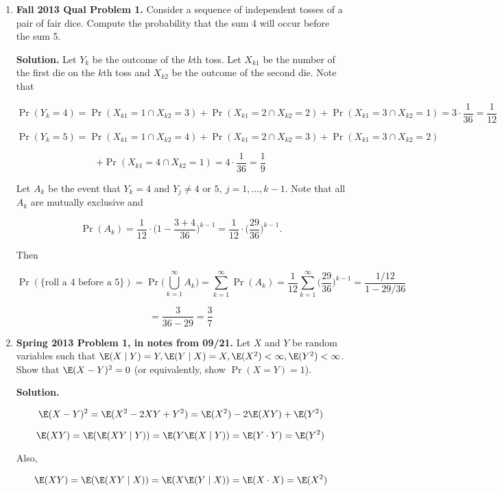 \begin{enumerate}[(1)]
\item \textbf{Fall 2013 Qual Problem 1.} Consider a sequence of independent tosses of a pair of fair dice. Compute the probability that the sum 4 will occur before the sum 5.

\textbf{Solution.} Let \(Y_k\) be the outcome of the \(k\)th toss. Let \(X_{k1}\) be the number of the first die on the \(k\)th toss and \(X_{k2}\) be the outcome of the second die. Note that

\[
\Pr(Y_k = 4) = \Pr(X_{k1} = 1 \cap X_{k2} = 3) + \Pr(X_{k1} = 2 \cap X_{k2} = 2) + \Pr(X_{k1} = 3 \cap X_{k2} = 1) = 3 \cdot \frac{1}{36} = \frac{1}{12} 
\]

\[
\Pr(Y_k = 5) = \Pr(X_{k1} = 1 \cap X_{k2} = 4) + \Pr(X_{k1} = 2 \cap X_{k2} = 3) + \Pr(X_{k1} = 3 \cap X_{k2} = 2) 
\]

\[
+ \Pr(X_{k1} = 4 \cap X_{k2} = 1) = 4 \cdot \frac{1}{36} = \frac{1}{9} 
\]

Let \(A_k\) be the event that \(Y_k = 4\) and \(Y_j \neq 4 \text{ or }5 , \  j = 1, \ldots, k-1\). Note that all \(A_k\) are mutually exclusive and 

\[
\Pr(A_k) = \frac{1}{12}\cdot \bigg(1 - \frac{3 + 4}{36} \bigg)^{k-1} = \frac{1}{12} \cdot \bigg( \frac{29}{36} \bigg)^{k-1}.
\]

Then

\[
\Pr(\{\text{roll a 4 before a 5}\}) = \Pr\bigg( \bigcup_{k=1}^\infty A_k \bigg) = \sum_{k=1}^\infty \Pr(A_k) = \frac{1}{12}  \sum_{k=1}^\infty \bigg( \frac{29}{36} \bigg)^{k-1} = \frac{1/12}{1 - 29/36}
\]

\[
= \frac{3}{36 -29} = \boxed{ \frac{3}{7}}
\]


\item \textbf{Spring 2013 Problem 1, in notes from 09/21.} Let \(X\) and \(Y\) be random variables such that  \(\E(X \mid Y) = Y, \E(Y \mid X) = X, \E(X^2) < \infty, \E(Y^2) < \infty\). Show that \(\E(X-Y)^2 = 0 \) (or equivalently, show \(\Pr(X = Y) = 1\)).

\textbf{Solution.} 

\[
\E(X-Y)^2 = \E(X^2 - 2XY + Y^2) = \E(X^2) - 2 \E(XY) + \E(Y^2)
\]

\[
\E(XY) = \E( \E(XY\mid Y)) = \E(Y\E(X\mid Y)) = \E(Y \cdot Y) = \E(Y^2)
\]

Also,

\[
\E(XY) = \E(\E(XY \mid X)) = \E(X \E(Y \mid X)) = \E( X \cdot X) = \E(X^2)
\]


\end{enumerate}
